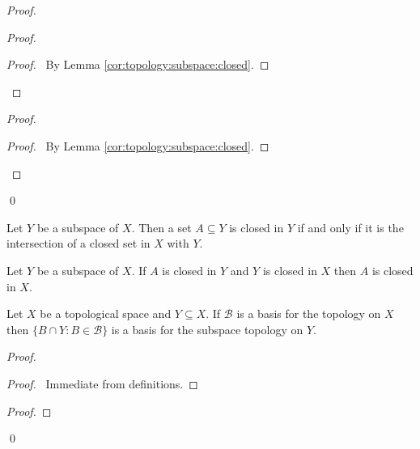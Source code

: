\begin{proof}
  \pf
  \begin{proof}
    \begin{proof}
      \pf\ By Lemma \ref{cor:topology:subspace:closed}.
    \end{proof}
  \end{proof}
  \begin{proof}
    \begin{proof}
      \pf\ By Lemma \ref{cor:topology:subspace:closed}.
    \end{proof}
  \end{proof}
  \qed
\end{proof}

\begin{cor}
  \label{cor:topology:subspace:closed}
  Let $Y$ be a subspace of $X$. Then a set $A \subseteq Y$ is closed in $Y$
  if
  and only if it is the intersection of a closed set in $X$ with $Y$.
\end{cor}

\begin{cor}
  \label{cor:topology:subspace:closed2}
  Let $Y$ be a subspace of $X$. If $A$ is closed in $Y$ and $Y$ is closed in
  $X$
  then $A$ is closed in $X$.
\end{cor}

\begin{lm}
  \label{lm:topology:subspace:basis}
  Let $X$ be a topological space and $Y \subseteq X$. If $\mathcal{B}$ is a
  basis for the topology on $X$ then $\{ B \cap Y : B \in \mathcal{B} \}$ is
  a
  basis for the subspace topology on $Y$.
\end{lm}

\begin{proof}
  \pf
  \begin{proof}
    \pf\ Immediate from definitions.
  \end{proof}
  \begin{proof}
  \end{proof}
  \qed
\end{proof}


